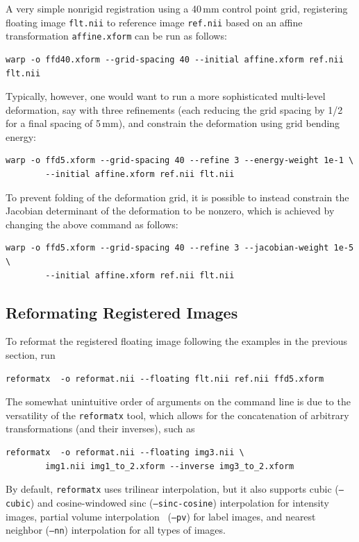 \documentclass{InsightArticle}
\begin{document}
A very simple nonrigid registration using a 40\,mm control point grid,
registering floating image \verb|flt.nii| to reference image \verb|ref.nii|
based on an affine transformation \verb|affine.xform| can be run as follows:
\begin{verbatim}
warp -o ffd40.xform --grid-spacing 40 --initial affine.xform ref.nii flt.nii
\end{verbatim}
Typically, however, one would want to run a more sophisticated multi-level
deformation, say with three refinements (each reducing the grid spacing by
1/2 for a final spacing of 5\,mm), and constrain the deformation using grid
bending energy:
\begin{verbatim}
warp -o ffd5.xform --grid-spacing 40 --refine 3 --energy-weight 1e-1 \
        --initial affine.xform ref.nii flt.nii
\end{verbatim}
To prevent folding of the deformation grid, it is possible to instead
constrain the Jacobian determinant of the deformation to be nonzero, which is
achieved by changing the above command as follows:
\begin{verbatim}
warp -o ffd5.xform --grid-spacing 40 --refine 3 --jacobian-weight 1e-5 \
        --initial affine.xform ref.nii flt.nii
\end{verbatim}

\subsection{Reformating Registered Images}

To reformat the registered floating image following the examples in
the previous section, run
\begin{verbatim}
reformatx  -o reformat.nii --floating flt.nii ref.nii ffd5.xform
\end{verbatim}
The somewhat unintuitive order of arguments on the command line is due to the
versatility of the \verb|reformatx| tool, which allows for the concatenation
of arbitrary transformations (and their inverses), such as
\begin{verbatim}
reformatx  -o reformat.nii --floating img3.nii \
        img1.nii img1_to_2.xform --inverse img3_to_2.xform
\end{verbatim} 
By default, \verb|reformatx| uses trilinear interpolation, but it also
supports cubic ({\tt --cubic}) and cosine-windowed sinc
({\tt --sinc-cosine}) interpolation for intensity images, partial volume
interpolation~\cite{MaesCollVand:1997} ({\tt --pv}) for label images, and
nearest neighbor ({\tt --nn}) interpolation for all types of images.
\end{document}
